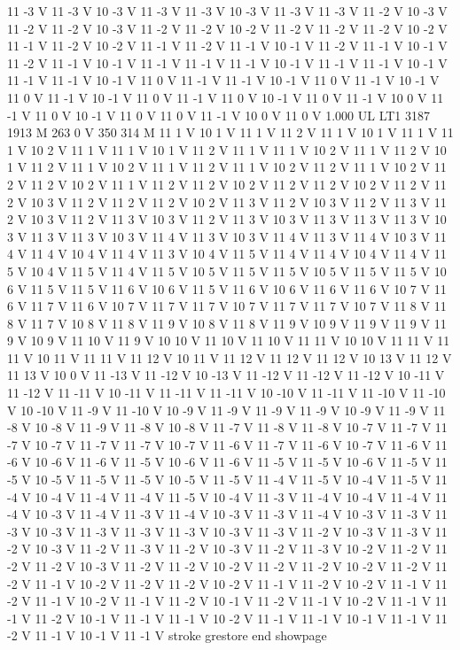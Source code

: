 {11 -3 V
11 -3 V
10 -3 V
11 -3 V
11 -3 V
10 -3 V
11 -3 V
11 -3 V
11 -2 V
10 -3 V
11 -2 V
11 -2 V
10 -3 V
11 -2 V
11 -2 V
10 -2 V
11 -2 V
11 -2 V
11 -2 V
10 -2 V
11 -1 V
11 -2 V
10 -2 V
11 -1 V
11 -2 V
11 -1 V
10 -1 V
11 -2 V
11 -1 V
10 -1 V
11 -2 V
11 -1 V
10 -1 V
11 -1 V
11 -1 V
11 -1 V
10 -1 V
11 -1 V
11 -1 V
10 -1 V
11 -1 V
11 -1 V
10 -1 V
11 0 V
11 -1 V
11 -1 V
10 -1 V
11 0 V
11 -1 V
10 -1 V
11 0 V
11 -1 V
10 -1 V
11 0 V
11 -1 V
11 0 V
10 -1 V
11 0 V
11 -1 V
10 0 V
11 -1 V
11 0 V
10 -1 V
11 0 V
11 0 V
11 -1 V
10 0 V
11 0 V
1.000 UL
LT1
3187 1913 M
263 0 V
350 314 M
11 1 V
10 1 V
11 1 V
11 2 V
11 1 V
10 1 V
11 1 V
11 1 V
10 2 V
11 1 V
11 1 V
10 1 V
11 2 V
11 1 V
11 1 V
10 2 V
11 1 V
11 2 V
10 1 V
11 2 V
11 1 V
10 2 V
11 1 V
11 2 V
11 1 V
10 2 V
11 2 V
11 1 V
10 2 V
11 2 V
11 2 V
10 2 V
11 1 V
11 2 V
11 2 V
10 2 V
11 2 V
11 2 V
10 2 V
11 2 V
11 2 V
10 3 V
11 2 V
11 2 V
11 2 V
10 2 V
11 3 V
11 2 V
10 3 V
11 2 V
11 3 V
11 2 V
10 3 V
11 2 V
11 3 V
10 3 V
11 2 V
11 3 V
10 3 V
11 3 V
11 3 V
11 3 V
10 3 V
11 3 V
11 3 V
10 3 V
11 4 V
11 3 V
10 3 V
11 4 V
11 3 V
11 4 V
10 3 V
11 4 V
11 4 V
10 4 V
11 4 V
11 3 V
10 4 V
11 5 V
11 4 V
11 4 V
10 4 V
11 4 V
11 5 V
10 4 V
11 5 V
11 4 V
11 5 V
10 5 V
11 5 V
11 5 V
10 5 V
11 5 V
11 5 V
10 6 V
11 5 V
11 5 V
11 6 V
10 6 V
11 5 V
11 6 V
10 6 V
11 6 V
11 6 V
10 7 V
11 6 V
11 7 V
11 6 V
10 7 V
11 7 V
11 7 V
10 7 V
11 7 V
11 7 V
10 7 V
11 8 V
11 8 V
11 7 V
10 8 V
11 8 V
11 9 V
10 8 V
11 8 V
11 9 V
10 9 V
11 9 V
11 9 V
11 9 V
10 9 V
11 10 V
11 9 V
10 10 V
11 10 V
11 10 V
11 11 V
10 10 V
11 11 V
11 11 V
10 11 V
11 11 V
11 12 V
10 11 V
11 12 V
11 12 V
11 12 V
10 13 V
11 12 V
11 13 V
10 0 V
11 -13 V
11 -12 V
10 -13 V
11 -12 V
11 -12 V
11 -12 V
10 -11 V
11 -12 V
11 -11 V
10 -11 V
11 -11 V
11 -11 V
10 -10 V
11 -11 V
11 -10 V
11 -10 V
10 -10 V
11 -9 V
11 -10 V
10 -9 V
11 -9 V
11 -9 V
11 -9 V
10 -9 V
11 -9 V
11 -8 V
10 -8 V
11 -9 V
11 -8 V
10 -8 V
11 -7 V
11 -8 V
11 -8 V
10 -7 V
11 -7 V
11 -7 V
10 -7 V
11 -7 V
11 -7 V
10 -7 V
11 -6 V
11 -7 V
11 -6 V
10 -7 V
11 -6 V
11 -6 V
10 -6 V
11 -6 V
11 -5 V
10 -6 V
11 -6 V
11 -5 V
11 -5 V
10 -6 V
11 -5 V
11 -5 V
10 -5 V
11 -5 V
11 -5 V
10 -5 V
11 -5 V
11 -4 V
11 -5 V
10 -4 V
11 -5 V
11 -4 V
10 -4 V
11 -4 V
11 -4 V
11 -5 V
10 -4 V
11 -3 V
11 -4 V
10 -4 V
11 -4 V
11 -4 V
10 -3 V
11 -4 V
11 -3 V
11 -4 V
10 -3 V
11 -3 V
11 -4 V
10 -3 V
11 -3 V
11 -3 V
10 -3 V
11 -3 V
11 -3 V
11 -3 V
10 -3 V
11 -3 V
11 -2 V
10 -3 V
11 -3 V
11 -2 V
10 -3 V
11 -2 V
11 -3 V
11 -2 V
10 -3 V
11 -2 V
11 -3 V
10 -2 V
11 -2 V
11 -2 V
11 -2 V
10 -3 V
11 -2 V
11 -2 V
10 -2 V
11 -2 V
11 -2 V
10 -2 V
11 -2 V
11 -2 V
11 -1 V
10 -2 V
11 -2 V
11 -2 V
10 -2 V
11 -1 V
11 -2 V
10 -2 V
11 -1 V
11 -2 V
11 -1 V
10 -2 V
11 -1 V
11 -2 V
10 -1 V
11 -2 V
11 -1 V
10 -2 V
11 -1 V
11 -1 V
11 -2 V
10 -1 V
11 -1 V
11 -1 V
10 -2 V
11 -1 V
11 -1 V
10 -1 V
11 -1 V
11 -2 V
11 -1 V
10 -1 V
11 -1 V
stroke
grestore
end
showpage
}
